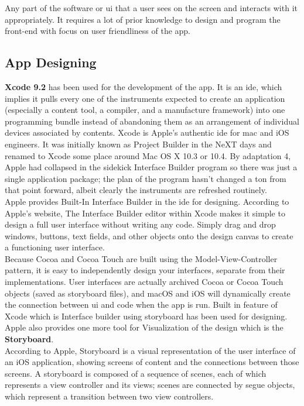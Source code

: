 Any part of the software or \gls{ui} that a user sees on the screen and interacts with it appropriately. It requires a lot of prior knowledge to design and program the front-end with focus on user friendliness of the app.

\subsection{App Designing}

\textbf{Xcode 9.2} has been used for the development of the app. It is an \gls{ide}, which implies it pulls every one of the instruments expected to create an application (especially a content tool, a compiler, and a manufacture framework) into one programming bundle instead of abandoning them as an arrangement of individual devices associated by contents. Xcode is Apple's authentic \gls{ide} for \gls{mac} and \gls{iOS} engineers. It was initially known as Project Builder in the NeXT days and renamed to Xcode some place around Mac OS X 10.3 or 10.4. By adaptation 4, Apple had collapsed in the sidekick Interface Builder program so there was just a single application package; the plan of the program hasn't changed a ton from that point forward, albeit clearly the instruments are refreshed routinely. \\
Apple provides Built-In Interface Builder in the \gls{ide} for designing.
According to Apple's website, The Interface Builder editor within Xcode makes it simple to design a full user interface without writing any code. Simply drag and drop windows, buttons, text fields, and other objects onto the design canvas to create a functioning user interface. \cite{Xcode} \\
Because Cocoa and Cocoa Touch are built using the Model-View-Controller pattern, it is easy to independently design your interfaces, separate from their implementations. User interfaces are actually archived Cocoa or Cocoa Touch objects (saved as storyboard files), and \gls{macOS} and \gls{iOS} will dynamically create the connection between \gls{ui} and code when the app is run. Built in feature of Xcode which is Interface builder using storyboard has been used for designing. Apple also provides one more tool for Visualization of the design which is the \textbf{Storyboard}. \\
According to Apple, Storyboard is a visual representation of the user interface of an \gls{iOS} application, showing screens of content and the connections between those screens. A storyboard is composed of a sequence of scenes, each of which represents a view controller and its views; scenes are connected by segue objects, which represent a transition between two view controllers. \cite{Storyboard}  \\
